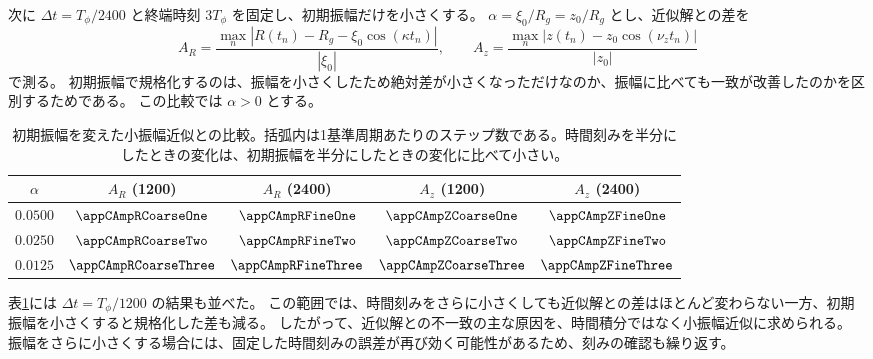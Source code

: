 次に $\Delta t=T_\phi/2400$ と終端時刻 $3T_\phi$ を固定し、初期振幅だけを小さくする。
$\alpha=\xi_0/R_g=z_0/R_g$ とし、近似解との差を
\begin{equation}
 A_R=\frac{\max_n|R(t_n)-R_g-\xi_0\cos(\kappa t_n)|}{|\xi_0|},\qquad
 A_z=\frac{\max_n|z(t_n)-z_0\cos(\nu_z t_n)|}{|z_0|}
\label{eq:appC-amplitude-differences}
\end{equation}
で測る。
初期振幅で規格化するのは、振幅を小さくしたため絶対差が小さくなっただけなのか、振幅に比べても一致が改善したのかを区別するためである。
この比較では $\alpha>0$ とする。

\begin{table}[!htbp]
\centering
\caption{初期振幅を変えた小振幅近似との比較。括弧内は1基準周期あたりのステップ数である。時間刻みを半分にしたときの変化は、初期振幅を半分にしたときの変化に比べて小さい。}
\label{tab:appC-amplitude-comparison}
\begin{tabular}{ccccc}
\toprule
$\alpha$ & $A_R$ (1200) & $A_R$ (2400) & $A_z$ (1200) & $A_z$ (2400) \\
\midrule
$0.0500$ & $\appCAmpRCoarseOne$ & $\appCAmpRFineOne$ & $\appCAmpZCoarseOne$ & $\appCAmpZFineOne$ \\
$0.0250$ & $\appCAmpRCoarseTwo$ & $\appCAmpRFineTwo$ & $\appCAmpZCoarseTwo$ & $\appCAmpZFineTwo$ \\
$0.0125$ & $\appCAmpRCoarseThree$ & $\appCAmpRFineThree$ & $\appCAmpZCoarseThree$ & $\appCAmpZFineThree$ \\
\bottomrule
\end{tabular}
\end{table}

表\ref{tab:appC-amplitude-comparison}には $\Delta t=T_\phi/1200$ の結果も並べた。
この範囲では、時間刻みをさらに小さくしても近似解との差はほとんど変わらない一方、初期振幅を小さくすると規格化した差も減る。
したがって、近似解との不一致の主な原因を、時間積分ではなく小振幅近似に求められる。
振幅をさらに小さくする場合には、固定した時間刻みの誤差が再び効く可能性があるため、刻みの確認も繰り返す。

